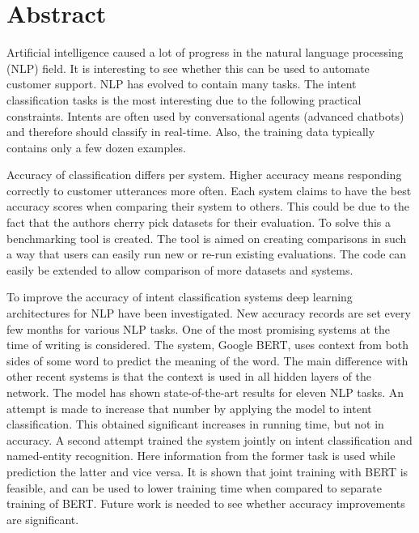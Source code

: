 \chapter*{Abstract}
\label{ch:abstract}

Artificial intelligence caused a lot of progress in the natural language processing (NLP) field.
It is interesting to see whether this can be used to automate customer support.
NLP has evolved to contain many tasks.
The intent classification tasks is the most interesting due to the following practical constraints.
Intents are often used by conversational agents (advanced chatbots) and therefore should classify in real-time.
Also, the training data typically contains only a few dozen examples.

Accuracy of classification differs per system.
Higher accuracy means responding correctly to customer utterances more often.
Each system claims to have the best accuracy scores when comparing their system to others.
This could be due to the fact that the authors cherry pick datasets for their evaluation.
To solve this a benchmarking tool is created.
The tool is aimed on creating comparisons in such a way that users can easily run new or re-run existing evaluations.
The code can easily be extended to allow comparison of more datasets and systems.

To improve the accuracy of intent classification systems deep learning architectures for NLP have been investigated.
New accuracy records are set every few months for various NLP tasks.
One of the most promising systems at the time of writing is considered.
The system, Google BERT, uses context from both sides of some word to predict the meaning of the word.
The main difference with other recent systems is that the context is used in all hidden layers of the network.
The model has shown state-of-the-art results for eleven NLP tasks.
An attempt is made to increase that number by applying the model to intent classification.
This obtained significant increases in running time, but not in accuracy.
A second attempt trained the system jointly on intent classification and named-entity recognition.
Here information from the former task is used while prediction the latter and vice versa.
It is shown that joint training with BERT is feasible, and can be used to lower training time when compared to separate training of BERT.
Future work is needed to see whether accuracy improvements are significant.
